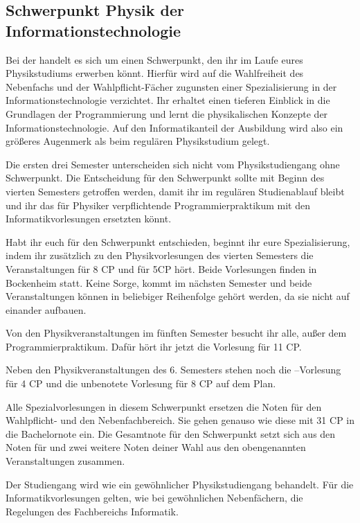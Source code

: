 \subsection{Schwerpunkt Physik der Informationstechnologie}
\bigskip
Bei der  handelt es sich um einen Schwerpunkt, den ihr im Laufe eures Physikstudiums erwerben könnt.
Hierfür wird auf die Wahlfreiheit des Nebenfachs und der Wahlpflicht-Fächer zugunsten einer Spezialisierung in der Informationstechnologie verzichtet. 
Ihr erhaltet einen tieferen Einblick in die Grundlagen der Programmierung und lernt die physikalischen Konzepte der Informationstechnologie.
Auf den Informatikanteil der Ausbildung wird also ein größeres Augenmerk als beim regulären Physikstudium gelegt.

Die ersten drei Semester unterscheiden sich nicht vom Physikstudiengang ohne Schwerpunkt.
Die Entscheidung für den Schwerpunkt sollte mit Beginn des vierten Semesters getroffen werden, damit ihr im regulären Studienablauf bleibt und ihr das für Physiker verpflichtende Programmierpraktikum mit den Informatikvorlesungen ersetzten könnt. 

Habt ihr euch für den Schwerpunkt entschieden, beginnt ihr eure Spezialisierung,
indem ihr zusätzlich zu den Physikvorlesungen des vierten Semesters die Veranstaltungen
 für 8 CP und  für 5CP hört.
Beide Vorlesungen finden in Bockenheim statt.
Keine Sorge,  kommt im nächsten Semester und beide Veranstaltungen können in beliebiger Reihenfolge gehört werden, da sie nicht auf einander aufbauen. 

Von den Physikveranstaltungen im fünften Semester besucht ihr alle, außer dem Programmierpraktikum.
Dafür hört ihr jetzt die Vorlesung  für 11 CP.

Neben den Physikveranstaltungen des 6. Semesters stehen noch die --Vorlesung für 4 CP und die unbenotete Vorlesung  für 8 CP auf dem Plan.

Alle Spezialvorlesungen in diesem Schwerpunkt ersetzen die Noten für den Wahlpflicht- und den Nebenfachbereich.
Sie gehen genauso wie diese mit 31 CP in die Bachelornote ein.
Die Gesamtnote f\"ur den Schwerpunkt setzt sich aus den Noten für 
und zwei weitere Noten deiner Wahl aus den obengenannten Veranstaltungen zusammen.

Der Studiengang wird wie ein gewöhnlicher Physikstudiengang behandelt.
Für die Informatikvorlesungen gelten, wie bei gewöhnlichen Nebenfächern,
die Regelungen des Fachbereichs Informatik. 

